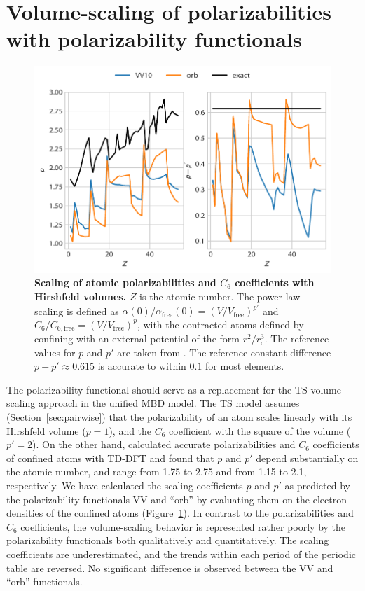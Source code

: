 \section{Volume-scaling of polarizabilities with polarizability functionals}

\begin{figure}
\includegraphics{media/pol-scaling.pdf}
\caption{\textbf{Scaling of atomic polarizabilities and $C_6$ coefficients with Hirshfeld volumes.}
$Z$ is the atomic number.
The power-law scaling is defined as $\alpha(0)/\alpha_\text{free}(0)=(V/V_\text{free})^{p'}$ and $C_6/C_{6,\text{free}}=(V/V_\text{free})^{p}$, with the contracted atoms defined by confining with an external potential of the form $r^2/r_\text{c}^3$.
The reference values for $p$ and $p'$ are taken from \citep{GouldJCP16}.
The reference constant difference $p-p'\approx0.615$ is accurate to within $0.1$ for most elements.
}\label{fig:pol-scaling}
\end{figure}

The polarizability functional should serve as a replacement for the TS volume-scaling approach in the unified MBD model.
The TS model assumes (Section~\ref{sec:pairwise}) that the polarizability of an atom scales linearly with its Hirshfeld volume ($p=1$), and the $C_6$ coefficient with the square of the volume ($p'=2$).
On the other hand, \citet{GouldJCP16} calculated accurate polarizabilities and $C_6$ coefficients of confined atoms with TD-DFT and found that $p$ and $p'$ depend substantially on the atomic number, and range from 1.75 to 2.75 and from 1.15 to 2.1, respectively.
We have calculated the scaling coefficients $p$ and $p'$ as predicted by the polarizability functionals VV and ``orb'' by evaluating them on the electron densities of the confined atoms (Figure~\ref{fig:pol-scaling}).
In contrast to the polarizabilities and $C_6$ coefficients, the volume-scaling behavior is represented rather poorly by the polarizability functionals both qualitatively and quantitatively.
The scaling coefficients are underestimated, and the trends within each period of the periodic table are reversed.
No significant difference is observed between the VV and ``orb'' functionals.

